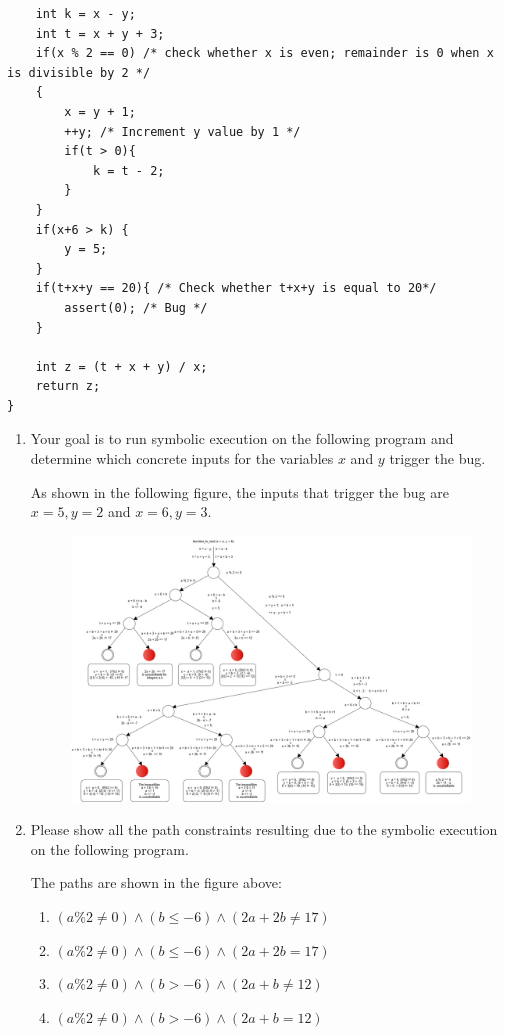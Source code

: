 \documentclass[12pt,a4paper]{article}
\begin{document}
\begin{enumerate}
\begin{lstlisting}
	int k = x - y;
	int t = x + y + 3;
	if(x % 2 == 0) /* check whether x is even; remainder is 0 when x is divisible by 2 */
	{
		x = y + 1;
		++y; /* Increment y value by 1 */
		if(t > 0){
			k = t - 2;
		}
	}	
	if(x+6 > k) {
		y = 5;
	}
	if(t+x+y == 20){ /* Check whether t+x+y is equal to 20*/
		assert(0); /* Bug */
	}
	
	int z = (t + x + y) / x; 
	return z;
}
\end{lstlisting}

\begin{enumerate}
\item Your goal is to run symbolic execution on the following program and determine which concrete inputs for the variables $x$ and $y$ trigger the bug.

\color{blue}

As shown in the following figure, the inputs that trigger the bug are $x=5, y = 2$ and $x = 6, y = 3$.

\begin{figure}[H]
 \centering
 \includegraphics[scale=.30,keepaspectratio=true]{./paths.png}
\end{figure}
\color{black}

\item Please show all the path constraints resulting due to the symbolic execution on the following program.

\color{blue}
The paths are shown in the figure above:

\begin{enumerate}
\item $(a\%2 \neq 0) \wedge (b \leq -6) \wedge (2a + 2b \neq 17)$
\item $(a\%2 \neq 0) \wedge (b \leq -6) \wedge (2a + 2b = 17)$
\item $(a\%2 \neq 0) \wedge (b > -6) \wedge (2a + b \neq 12)$
\item $(a\%2 \neq 0) \wedge (b > -6) \wedge (2a + b = 12)$


\end{enumerate}
\end{enumerate}
\end{enumerate}
\end{document}
